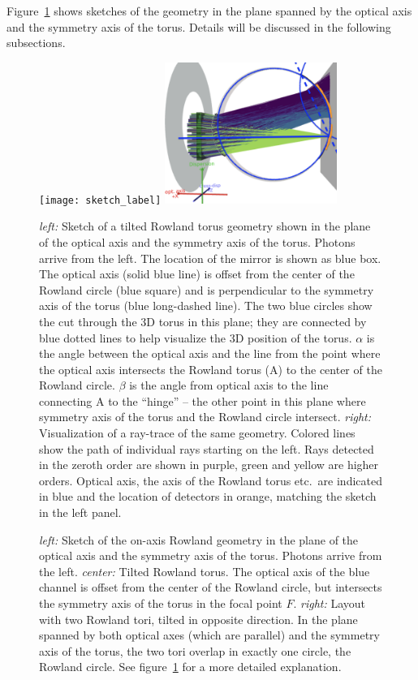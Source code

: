 \documentclass[linenumbers]{aastex631}
\begin{document}
Figure~\ref{fig:sketch_label} shows sketches of the geometry in the plane spanned by the optical axis and the symmetry axis of the torus. Details will be discussed in the following subsections.
\begin{figure}
    \texttt{[image: sketch\_label]}
    \includegraphics[width=0.5\textwidth]{raytrace_labelled}
    \caption{\emph{left:} Sketch of a tilted Rowland torus geometry shown in the plane of the optical axis and the symmetry axis of the torus. Photons arrive from the left. The location of the mirror is shown as blue box. The optical axis (solid blue line) is offset from the center of the Rowland circle (blue square) and is perpendicular to the symmetry axis of the torus (blue long-dashed line). The two blue circles show the cut through the 3D torus in this plane; they are connected by blue dotted lines to help visualize the 3D position of the torus. $\alpha$ is the angle between the optical axis and the line from the point where the optical axis intersects the Rowland torus (A) to the center of the Rowland circle. $\beta$ is the angle from optical axis to the line connecting A to the ``hinge'' -- the other point in this plane where symmetry axis of the torus and the Rowland circle intersect.
    \emph{right:} Visualization of a ray-trace of the same geometry. Colored lines show the path of individual rays starting on the left. Rays detected in the zeroth order are shown in purple, green and yellow are higher orders. Optical axis, the axis of the Rowland torus etc.\ are indicated in blue and the location of detectors in orange, matching the sketch in the left panel.
        }
    \label{fig:sketch_label}
\end{figure}
\begin{figure}
    \caption{\emph{left:} Sketch of the on-axis Rowland geometry in the plane of the optical axis and the symmetry axis of the torus. Photons arrive from the left.
    \emph{center:} Tilted Rowland torus. The optical axis of the blue channel is offset from the center of the Rowland circle, but intersects the symmetry axis of the torus in the focal point $F$.
    \emph{right:} Layout with two Rowland tori, tilted in opposite direction. In the plane spanned by both optical axes (which are parallel) and the symmetry axis of the torus, the two tori overlap in exactly one circle, the Rowland circle. See figure~\ref{fig:sketch_label} for a more detailed explanation.
        }
    \label{fig:sketch}
\end{figure}
\end{document}
